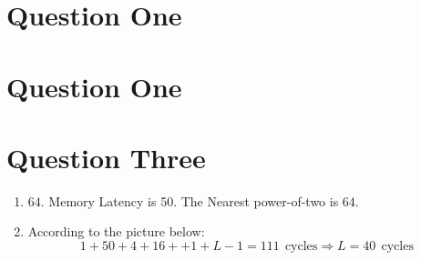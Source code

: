 \documentclass[12pt]{article}
\begin{document}
\section{Question One}

\newpage

\section{Question One}

\newpage



\section{Question Three}


\begin{enumerate}[label=\alph*.]
	
	\item 
	
	$64$. Memory Latency is 50. The Nearest power-of-two is $64$.
	
	
	\item 
		
		According to the picture below: 
	$$1 + 50 + 4 + 16 + + 1+ L-1 = 111 ~~\text{cycles} \Rightarrow L = 40 ~~\text{cycles}$$
	
	
	
	\begin{tikzpicture}[x=0.75pt,y=0.75pt,yscale=-1,xscale=1]
		

\end{tikzpicture}
\end{enumerate}
\end{document}
